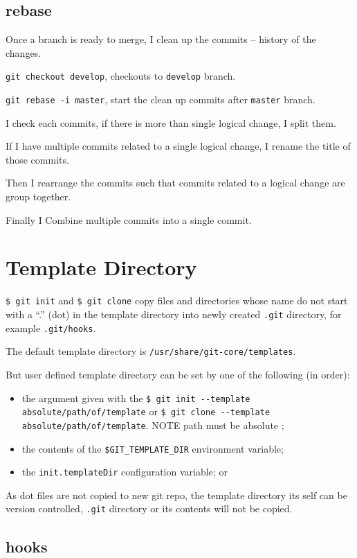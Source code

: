 \subsection{rebase} \label{git_rebase}
Once a branch is ready to merge, I clean up the commits -- history of the changes. 


\texttt{git checkout develop}, checkouts to \texttt{develop} branch.

\texttt{git rebase -i master}, start the clean up commits after \texttt{master} branch.

I check each commits, if there is more than single logical change, I split them.

If I have multiple commits related to a single logical change, I rename the title of those commits.

Then I rearrange the commits such that commits related to a logical change are group together.

Finally I Combine multiple commits into a single commit.


\section{Template Directory}%
\label{sec:template_directory}

\texttt{\$ git init} and \texttt{\$ git clone} copy files and directories whose name do not start with a ``.'' (dot) in the template directory into newly created \texttt{.git} directory, for example \texttt{.git/hooks}.

The default template directory is \texttt{/usr/share/git-core/templates}.

But user defined template directory can be set by one of the following (in order):
\begin{itemize}
  \item the argument given with the \texttt{\$ git init -{}-template absolute/path/of/template} or \texttt{\$ git clone -{}-template absolute/path/of/template}. NOTE path must be absolute ;
  \item the contents of the \texttt{\$GIT\_TEMPLATE\_DIR} environment variable;
  \item the \texttt{init.templateDir} configuration variable; or
\end{itemize}


As dot files are not copied to new git repo, the template directory its self can be version controlled, \texttt{.git} directory or its contents will not be copied.


\subsection{hooks}
